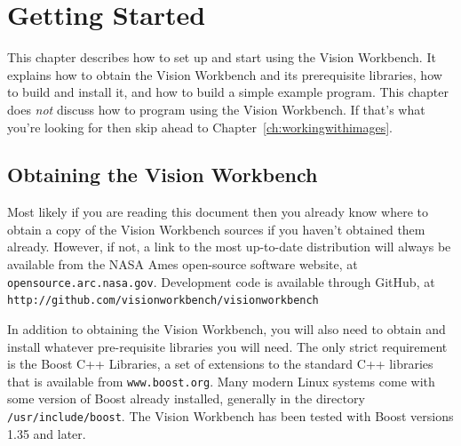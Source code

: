 \chapter{Getting Started}\label{ch:gettingstarted}

This chapter describes how to set up and start using the Vision
Workbench.  It explains how to obtain the Vision Workbench and its
prerequisite libraries, how to build and install it, and how to build
a simple example program.  This chapter does {\it not} discuss how to
program using the Vision Workbench.  If that's what you're looking for
then skip ahead to Chapter~\ref{ch:workingwithimages}.

\section{Obtaining the Vision Workbench}
\label{sec:obtaining-vw}

Most likely if you are reading this document then you already know
where to obtain a copy of the Vision Workbench sources if you haven't
obtained them already.  However, if not, a link to the most up-to-date
distribution will always be available from the NASA Ames open-source
software website, at \verb#opensource.arc.nasa.gov#. Development code
is available through GitHub, at
\verb#http://github.com/visionworkbench/visionworkbench#

In addition to obtaining the Vision Workbench, you will also need to
obtain and install whatever pre-requisite libraries you will need.
The only strict requirement is the Boost C++ Libraries, a set of
extensions to the standard C++ libraries that is available from
\verb#www.boost.org#.  Many modern Linux systems come with some
version of Boost already installed, generally in the directory
\verb#/usr/include/boost#.  The Vision Workbench has been tested with
Boost versions 1.35 and later.

